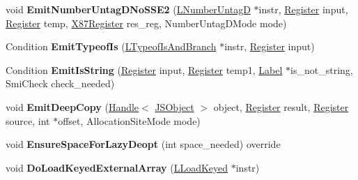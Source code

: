 \begin{DoxyCompactItemize}
\item 
void {\bfseries Emit\+Number\+Untag\+D\+No\+S\+S\+E2} (\hyperlink{classv8_1_1internal_1_1_l_number_untag_d}{L\+Number\+UntagD} $\ast$instr, \hyperlink{structv8_1_1internal_1_1_register}{Register} input, \hyperlink{structv8_1_1internal_1_1_register}{Register} temp, \hyperlink{structv8_1_1internal_1_1_double_register}{X87\+Register} res\+\_\+reg, Number\+Untag\+D\+Mode mode)\hypertarget{classv8_1_1internal_1_1_l_code_gen_abaf05061d03cf604673ecd0021ec1c80}{}\label{classv8_1_1internal_1_1_l_code_gen_abaf05061d03cf604673ecd0021ec1c80}

\item 
Condition {\bfseries Emit\+Typeof\+Is} (\hyperlink{classv8_1_1internal_1_1_l_typeof_is_and_branch}{L\+Typeof\+Is\+And\+Branch} $\ast$instr, \hyperlink{structv8_1_1internal_1_1_register}{Register} input)\hypertarget{classv8_1_1internal_1_1_l_code_gen_a06f252ea52c3c12e6489c065c4304795}{}\label{classv8_1_1internal_1_1_l_code_gen_a06f252ea52c3c12e6489c065c4304795}

\item 
Condition {\bfseries Emit\+Is\+String} (\hyperlink{structv8_1_1internal_1_1_register}{Register} input, \hyperlink{structv8_1_1internal_1_1_register}{Register} temp1, \hyperlink{classv8_1_1internal_1_1_label}{Label} $\ast$is\+\_\+not\+\_\+string, Smi\+Check check\+\_\+needed)\hypertarget{classv8_1_1internal_1_1_l_code_gen_a23c72e27a6bf50a391c940939754673d}{}\label{classv8_1_1internal_1_1_l_code_gen_a23c72e27a6bf50a391c940939754673d}

\item 
void {\bfseries Emit\+Deep\+Copy} (\hyperlink{classv8_1_1internal_1_1_handle}{Handle}$<$ \hyperlink{classv8_1_1internal_1_1_j_s_object}{J\+S\+Object} $>$ object, \hyperlink{structv8_1_1internal_1_1_register}{Register} result, \hyperlink{structv8_1_1internal_1_1_register}{Register} source, int $\ast$offset, Allocation\+Site\+Mode mode)\hypertarget{classv8_1_1internal_1_1_l_code_gen_a1a84a4d1ebc9ba8736407dd2a6d1214a}{}\label{classv8_1_1internal_1_1_l_code_gen_a1a84a4d1ebc9ba8736407dd2a6d1214a}

\item 
void {\bfseries Ensure\+Space\+For\+Lazy\+Deopt} (int space\+\_\+needed) override\hypertarget{classv8_1_1internal_1_1_l_code_gen_aef92ad7e2537ea5ecfdd73252a97eb48}{}\label{classv8_1_1internal_1_1_l_code_gen_aef92ad7e2537ea5ecfdd73252a97eb48}

\item 
void {\bfseries Do\+Load\+Keyed\+External\+Array} (\hyperlink{classv8_1_1internal_1_1_l_load_keyed}{L\+Load\+Keyed} $\ast$instr)\hypertarget{classv8_1_1internal_1_1_l_code_gen_aba1cb2ce022b8f9b1e4a86a9f57356c8}{}\label{classv8_1_1internal_1_1_l_code_gen_aba1cb2ce022b8f9b1e4a86a9f57356c8}


\end{DoxyCompactItemize}
